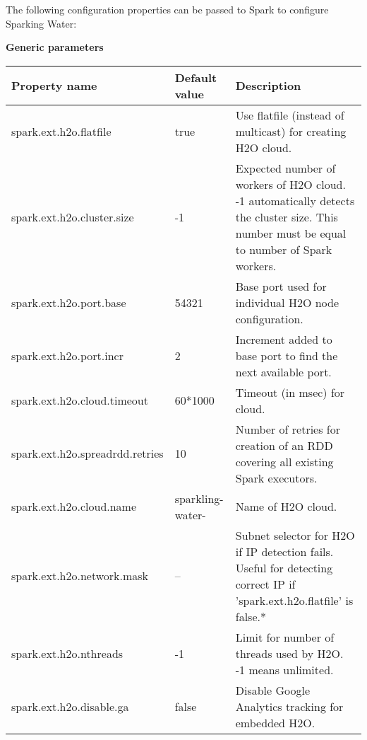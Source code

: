 The following configuration properties can be passed to Spark to configure Sparking Water:

\textbf{Generic parameters}
\begin{table}[!ht]
\centering
{\small
\begin{tabular}{l l p{4.0cm}}
\toprule
Property name & Default value  & Description \\
\midrule
		
spark.ext.h2o.flatfile 	& true & Use flatfile (instead of multicast) for creating H2O cloud. \\  \addlinespace

spark.ext.h2o.cluster.size 	& -1 & Expected number of workers of H2O cloud. -1 automatically
detects the cluster size. This number must be equal to number of Spark workers.\\  \addlinespace

spark.ext.h2o.port.base  & 54321 & Base port used for individual H2O node configuration.\\  \addlinespace

spark.ext.h2o.port.incr  & 2 & Increment added to base port to find the next available port.\\  \addlinespace

spark.ext.h2o.cloud.timeout  & 60*1000 & Timeout (in msec) for cloud.\\  \addlinespace

spark.ext.h2o.spreadrdd.retries & 10 & Number of retries for creation of an RDD covering all existing Spark executors.\\  \addlinespace

spark.ext.h2o.cloud.name & sparkling-water- & Name of H2O cloud.\\  \addlinespace

spark.ext.h2o.network.mask & -- & Subnet selector for H2O if IP detection fails. Useful for detecting correct IP if 'spark.ext.h2o.flatfile' is false.*\\  \addlinespace

spark.ext.h2o.nthreads  & -1 & Limit for number of threads used by H2O. -1 means unlimited.\\  \addlinespace

spark.ext.h2o.disable.ga 	& false &Disable Google Analytics tracking for embedded H2O.\\

\bottomrule
\end{tabular} 
} %
\end{table}

